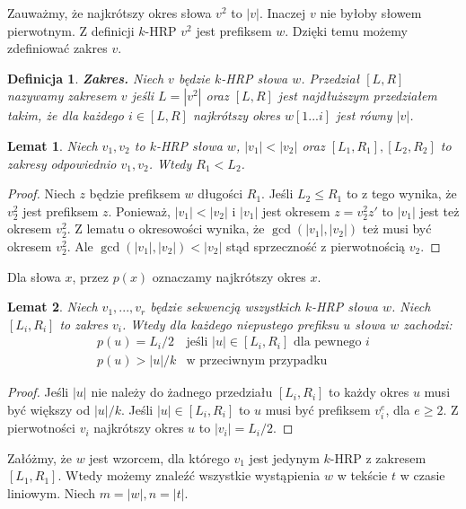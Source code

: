 \documentclass{article}
\newtheorem{definition}{Definicja}[section]
\newtheorem{lemma}{Lemat}[section]
\begin{document}
Zauważmy, że najkrótszy okres słowa $v^2$ to $|v|$. Inaczej $v$ nie byłoby słowem pierwotnym. Z definicji $k$-HRP $v^2$ jest prefiksem $w$. Dzięki temu możemy zdefiniować zakres $v$.

\begin{definition}
\textbf{\textit{Zakres.}}
Niech $v$ będzie $k$-HRP słowa $w$. Przedział $[L, R]$ nazywamy zakresem $v$ jeśli $L = |v^2|$ oraz $[L,R]$ jest najdłuższym przedziałem takim, że dla każdego $i \in [L, R]$ najkrótszy okres $w[1...i]$ jest równy $|v|$.
\end{definition}

\begin{lemma}\label{Lem_1}
Niech $v_1, v_2$ to $k$-HRP słowa $w$, $|v_1| < |v_2|$ oraz $[L_1, R_1], [L_2, R_2]$ to zakresy odpowiednio $v_1, v_2$. Wtedy $R_1 < L_2$.
\end{lemma}
\begin{proof}
Niech $z$ będzie prefiksem $w$ długości $R_1$. Jeśli $L_2 \leq R_1$ to z tego wynika, że $v_2^2$ jest prefiksem $z$. Ponieważ, $|v_1| < |v_2|$ i $|v_1|$ jest okresem $z = v_2^2 z'$ to $|v_1|$ jest też okresem $v_2^2$. Z lematu o okresowości wynika, że $\gcd(|v_1|, |v_2|)$ też musi być okresem $v_2^2$. Ale $\gcd(|v_1|, |v_2|) < |v_2|$ stąd sprzeczność z pierwotnością $v_2$.
\end{proof}

Dla słowa $x$, przez $p(x)$ oznaczamy najkrótszy okres $x$.

\begin{lemma}\label{Lem_2}
Niech $v_1, ..., v_r$ będzie sekwencją wszystkich $k$-HRP słowa $w$. Niech $[L_i, R_i]$ to zakres $v_i$. Wtedy dla każdego niepustego prefiksu $u$ słowa $w$ zachodzi:
$$\begin{array}{rl}
    p(u) = L_i/2 & \text{jeśli $|u| \in [L_i, R_i]$ dla pewnego $i$} \\
    p(u) > |u|/k & \text{w przeciwnym przypadku}
\end{array}$$
\end{lemma}
\begin{proof}
Jeśli $|u|$ nie należy do żadnego przedziału $[L_i, R_i]$ to każdy okres $u$ musi być większy od $|u|/k$. 
Jeśli $|u| \in [L_i, R_i]$ to $u$ musi być prefiksem $v_i^e$, dla $e \geq 2$. Z pierwotności $v_i$ najkrótszy okres $u$ to $|v_i| = L_i / 2$.
\end{proof}

Załóżmy, że $w$ jest wzorcem, dla którego $v_1$ jest jedynym $k$-HRP z zakresem $[L_1, R_1]$. Wtedy możemy znaleźć wszystkie wystąpienia $w$ w tekście $t$ w czasie liniowym.
Niech $m = |w|, n = |t|$.
\end{document}
